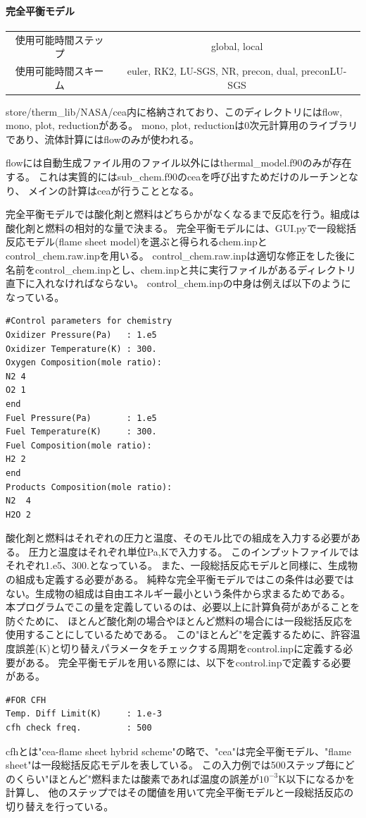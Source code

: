 \documentclass{jsarticle}
\begin{document}
\paragraph{完全平衡モデル}%
\begin{center}
\begin{tabular}{c||c}\hline
使用可能時間ステップ & global, local\\
使用可能時間スキーム & euler, RK2, LU-SGS, NR, precon, dual, preconLU-SGS\\
\hline
\end{tabular}
\end{center}
store/therm\_lib/NASA/cea内に格納されており、このディレクトリにはflow, mono, plot, reductionがある。
mono, plot, reductionは0次元計算用のライブラリであり、流体計算にはflowのみが使われる。

flowには自動生成ファイル用のファイル以外にはthermal\_model.f90のみが存在する。
これは実質的にはsub\_chem.f90のceaを呼び出すためだけのルーチンとなり、
メインの計算はceaが行うこととなる。

完全平衡モデルでは酸化剤と燃料はどちらかがなくなるまで反応を行う。組成は酸化剤と燃料の相対的な量で決まる。
完全平衡モデルには、GUI.pyで一段総括反応モデル(flame sheet model)を選ぶと得られるchem.inpとcontrol\_chem.raw.inpを用いる。
control\_chem.raw.inpは適切な修正をした後に名前をcontrol\_chem.inpとし、chem.inpと共に実行ファイルがあるディレクトリ直下に入れなければならない。
control\_chem.inpの中身は例えば以下のようになっている。
\begin{verbatim}
#Control parameters for chemistry
Oxidizer Pressure(Pa)   : 1.e5
Oxidizer Temperature(K) : 300.
Oxygen Composition(mole ratio):
N2 4
O2 1
end
Fuel Pressure(Pa)       : 1.e5
Fuel Temperature(K)     : 300.
Fuel Composition(mole ratio):
H2 2
end
Products Composition(mole ratio):
N2  4
H2O 2
\end{verbatim}
酸化剤と燃料はそれぞれの圧力と温度、そのモル比での組成を入力する必要がある。
圧力と温度はそれぞれ単位Pa,Kで入力する。
このインプットファイルではそれぞれ1.e5、300.となっている。
また、一段総括反応モデルと同様に、生成物の組成も定義する必要がある。
純粋な完全平衡モデルではこの条件は必要ではない。生成物の組成は自由エネルギー最小という条件から求まるためである。
本プログラムでこの量を定義しているのは、必要以上に計算負荷があがることを防ぐために、
ほとんど酸化剤の場合やほとんど燃料の場合には一段総括反応を使用することにしているためである。
この"ほとんど"を定義するために、許容温度誤差(K)と切り替えパラメータをチェックする周期をcontrol.inpに定義する必要がある。
完全平衡モデルを用いる際には、以下をcontrol.inpで定義する必要がある。
\begin{verbatim}
#FOR CFH
Temp. Diff Limit(K)     : 1.e-3
cfh check freq.         : 500
\end{verbatim}
cfhとは"cea-flame sheet hybrid scheme"の略で、"cea"は完全平衡モデル、"flame sheet"は一段総括反応モデルを表している。
この入力例では500ステップ毎にどのくらい"ほとんど"燃料または酸素であれば温度の誤差が$10^{-3}$K以下になるかを計算し、
他のステップではその閾値を用いて完全平衡モデルと一段総括反応の切り替えを行っている。
\end{document}
